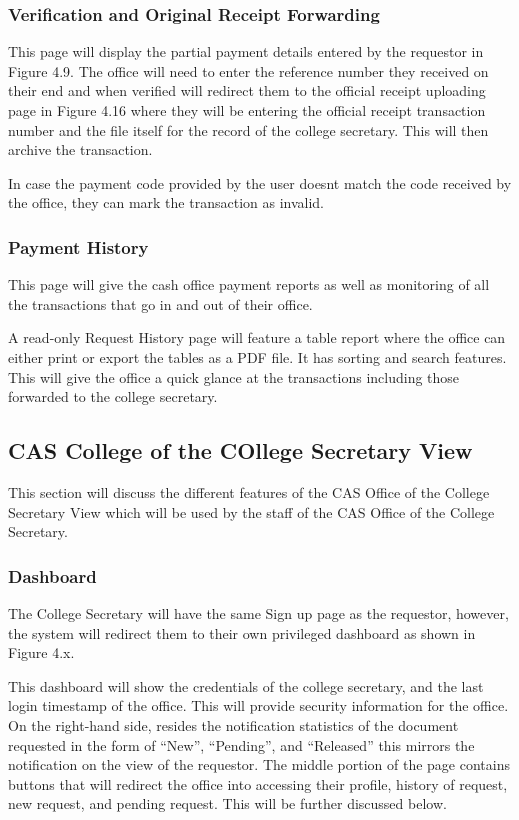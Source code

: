 \subsubsection{Verification and Original Receipt Forwarding}

This page will display the partial payment details entered by the requestor in Figure 4.9. The office will need to enter the reference number they received on their end and when verified will redirect them to the official receipt uploading page in Figure 4.16 where they will be entering the official receipt transaction number and the file itself for the record of the college secretary. This will then archive the transaction.

In case the payment code provided by the user doesn\textsc{}t match the code received by the office, they can mark the transaction as invalid.

\subsubsection{Payment History}

This page will give the cash office payment reports as well as monitoring of all the transactions that go in and out of their office.

A read-only  Request History page will feature a table report where the office can either print or export the tables as a PDF file. It has sorting and search features. This will give the office a quick glance at the transactions including those forwarded to the college secretary.


\subsection{CAS College of the COllege Secretary View}

This section will discuss the different features of the CAS Office of the College Secretary View which will be used by the staff of the CAS Office of the College Secretary.



\subsubsection{Dashboard}
The College Secretary will have the same Sign up page as the requestor, however, the system will redirect them to their own privileged dashboard as shown in Figure 4.x. 

This dashboard will show the credentials of the college secretary, and the last login timestamp of the office. This will provide security information for the office. On the right-hand side, resides the notification statistics of the document requested in the form of “New”, “Pending”, and “Released” this mirrors the notification on the view of the requestor. The middle portion of the page contains buttons that will redirect the office into accessing their profile, history of request, new request, and pending request. This will be further discussed below.

